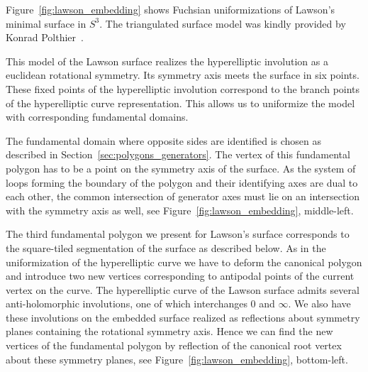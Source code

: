 \documentclass[Thesis]{subfiles}
\begin{document}
Figure~\ref{fig:lawson_embedding} shows Fuchsian uniformizations of
Lawson's minimal surface in $S^{3}$. The triangulated surface
model was kindly provided by Konrad Polthier~\cite{polthier97}.

This model of the Lawson surface realizes the hyperelliptic involution
as a euclidean rotational symmetry.  Its symmetry axis meets the
surface in six points. These fixed points of the hyperelliptic
involution correspond to the branch points of the hyperelliptic curve
representation. This allows us to uniformize the model with
corresponding fundamental domains. 


The fundamental domain where opposite sides are identified is chosen
as described in Section~\ref{sec:polygons_generators}. 
The vertex of this fundamental polygon has to
be a point on the symmetry axis of the surface. 
As the system of loops forming the boundary of the polygon
and their identifying axes are dual to each other, the common
intersection of generator axes must lie on an intersection with the
symmetry axis as well, see Figure~\ref{fig:lawson_embedding},
middle-left.

 The third fundamental polygon we present for Lawson's surface corresponds to the square-tiled segmentation of the surface as described below. As in the uniformization of the hyperelliptic curve we have to deform the canonical polygon and introduce two new vertices corresponding to antipodal points of the current vertex on the curve. The hyperelliptic curve of the Lawson surface admits several anti-holomorphic involutions, one of which interchanges $0$ and $\infty$. We also have these involutions on the embedded surface realized as reflections about symmetry planes containing the rotational symmetry axis. Hence we can find the new vertices of the fundamental polygon by reflection of the canonical root vertex about these symmetry planes, see Figure~\ref{fig:lawson_embedding}, bottom-left.

\end{document}
